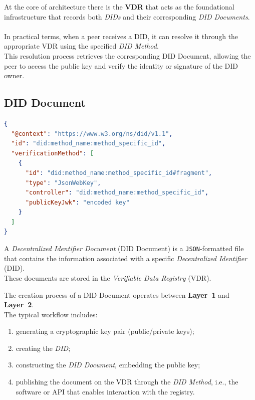 \noindent
At the core of architecture there is the \textbf{VDR} that acts as the foundational infrastructure that records both \textit{DIDs} and their corresponding \textit{DID Documents}.\\
\\
In practical terms, when a peer receives a DID, it can resolve it through the appropriate VDR using the specified \textit{DID Method}.\\  
This resolution process retrieves the corresponding DID Document, allowing the peer to access the public key and verify the identity or signature of the DID owner.

\subsection{DID Document}

\begin{lstlisting}[language=json, caption={Esempio DID Document (W3C)}]
{
  "@context": "https://www.w3.org/ns/did/v1.1",
  "id": "did:method_name:method_specific_id",
  "verificationMethod": [
    {
      "id": "did:method_name:method_specific_id#fragment",
      "type": "JsonWebKey",
      "controller": "did:method_name:method_specific_id",
      "publicKeyJwk": "encoded key"
    }
  ]
}
\end{lstlisting}

\noindent
A \textit{Decentralized Identifier Document} (DID Document) is a \texttt{JSON}-formatted file that contains the information associated with a specific \textit{Decentralized Identifier} (DID).\\
These documents are stored in the \textit{Verifiable Data Registry} (VDR).

\medskip

\noindent
The creation process of a DID Document operates between \textbf{Layer~1} and \textbf{Layer~2}.\\
The typical workflow includes:
\begin{enumerate}
    \item generating a cryptographic key pair (public/private keys);
    \item creating the \textit{DID};
    \item constructing the \textit{DID Document}, embedding the public key;
    \item publishing the document on the VDR through the \textit{DID Method}, i.e., the software or API that enables interaction with the registry.
\end{enumerate}

